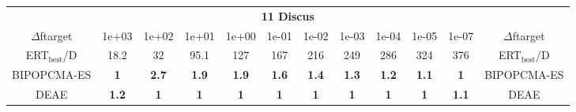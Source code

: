 \begin{tabular}{cccccccccccc}
 & \multicolumn{10}{c}{{\normalsize \textbf{11 Discus}}}\\
$\Delta$ftarget& 1e+03& 1e+02& 1e+01& 1e+00& 1e-01& 1e-02& 1e-03& 1e-04& 1e-05& 1e-07 & $\Delta$ftarget \\
ERT$_{\textrm{best}}$/D& 18.2& 32& 95.1& 127& 167& 216& 249& 286& 324& 376 & ERT$_{\textrm{best}}$/D \\
\hline
BIPOPCMA-ES & \textbf{1} & \textbf{2.7} & \textbf{1.9} & \textbf{1.9} & \textbf{1.6} & \textbf{1.4} & \textbf{1.3} & \textbf{1.2} & \textbf{1.1} & \textbf{1} & BIPOPCMA-ES \cite{add_an_entry_for_BIPOPCMA-ES_in_bbob.bib}\\
DEAE & \textbf{1.2} & \textbf{1} & \textbf{1} & \textbf{1} & \textbf{1} & \textbf{1} & \textbf{1} & \textbf{1} & \textbf{1} & \textbf{1.1} & DEAE \cite{add_an_entry_for_DEAE_in_bbob.bib}
\end{tabular}
